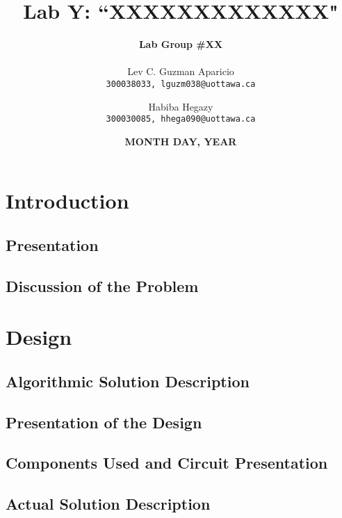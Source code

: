 \documentclass[16pt, letterpaper]{article}
\title{ 
	\textbf{\huge Lab Y: ``XXXXXXXXXXXXX" } \newline \newline {\Large CEG2136 Section A \\ TA('s): ``xxxx" }
	   }
\author{\textbf{\Large Lab Group \#XX} \\ \\
	Lev C. Guzman Aparicio\\
	\texttt{300038033, lguzm038@uottawa.ca}
	\and 
	Habiba Hegazy\\
	\texttt{300030085, hhega090@uottawa.ca} 	
		}
\date{\textbf{MONTH DAY, YEAR}}
\begin{document}
	
	\begin{titlepage}
		\maketitle
	\end{titlepage}

	{ \large \tableofcontents }
	\newpage
	



		\section{Introduction}
		
			\subsection{Presentation}
		
			\subsection{Discussion of the Problem}
			
			
	
		\section{Design}
		
			\subsection{Algorithmic Solution Description}
			
			
			
			\subsection{Presentation of the Design}
			
			
			
			\subsection{Components Used and Circuit Presentation}
			
			
			
			\subsection{Actual Solution Description}
			
			
			
\end{document}
